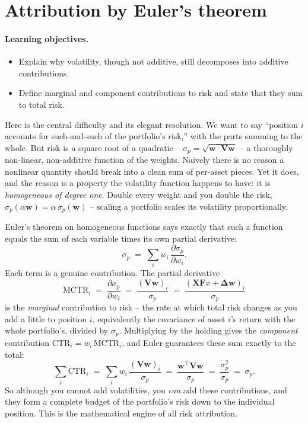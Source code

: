 \documentclass[11pt]{article}
\theoremstyle{definition}
\theoremstyle{plain}
\theoremstyle{remark}
\newcommand{\T}{^{\!\top}}
\newcommand{\wvec}{\mathbf{w}}
\newcommand{\Xmat}{\mathbf{X}}
\newcommand{\Fmat}{\mathbf{F}}
\newcommand{\Vmat}{\mathbf{V}}
\newcommand{\Del}{\boldsymbol{\Delta}}
\begin{document}
\section{Attribution by Euler's theorem}\label{sec:euler}

\paragraph{Learning objectives.}
\begin{itemize}[leftmargin=1.4em,topsep=2pt]
  \item Explain why volatility, though not additive, still decomposes into additive contributions.
  \item Define marginal and component contributions to risk and state that they sum to total risk.
\end{itemize}

Here is the central difficulty and its elegant resolution. We want to say ``position $i$ accounts for such-and-such of the portfolio's risk,'' with the parts summing to the whole. But risk is a square root of a quadratic -- $\sigma_p=\sqrt{\wvec\T\Vmat\wvec}$ -- a thoroughly non-linear, non-additive function of the weights. Naively there is no reason a nonlinear quantity should break into a clean sum of per-asset pieces. Yet it does, and the reason is a property the volatility function happens to have: it is \emph{homogeneous of degree one}. Double every weight and you double the risk, $\sigma_p(\alpha\wvec)=\alpha\,\sigma_p(\wvec)$ -- scaling a portfolio scales its volatility proportionally.

Euler's theorem on homogeneous functions says exactly that such a function equals the sum of each variable times its own partial derivative:
\[
\sigma_p \;=\; \sum_i w_i\,\frac{\partial \sigma_p}{\partial w_i}.
\]
Each term is a genuine contribution. The partial derivative
\[
\text{MCTR}_i \;=\; \frac{\partial \sigma_p}{\partial w_i} \;=\; \frac{(\Vmat\wvec)_i}{\sigma_p} \;=\; \frac{(\Xmat\Fmat x + \Del\wvec)_i}{\sigma_p}
\]
is the \emph{marginal} contribution to risk -- the rate at which total risk changes as you add a little to position $i$, equivalently the covariance of asset $i$'s return with the whole portfolio's, divided by $\sigma_p$. Multiplying by the holding gives the \emph{component} contribution $\text{CTR}_i = w_i\,\text{MCTR}_i$, and Euler guarantees these sum exactly to the total:
\[
\sum_i \text{CTR}_i \;=\; \sum_i w_i\,\frac{(\Vmat\wvec)_i}{\sigma_p} \;=\; \frac{\wvec\T\Vmat\wvec}{\sigma_p} \;=\; \frac{\sigma_p^2}{\sigma_p} \;=\; \sigma_p .
\]
So although you cannot add volatilities, you \emph{can} add these contributions, and they form a complete budget of the portfolio's risk down to the individual position. This is the mathematical engine of all risk attribution.
\end{document}

